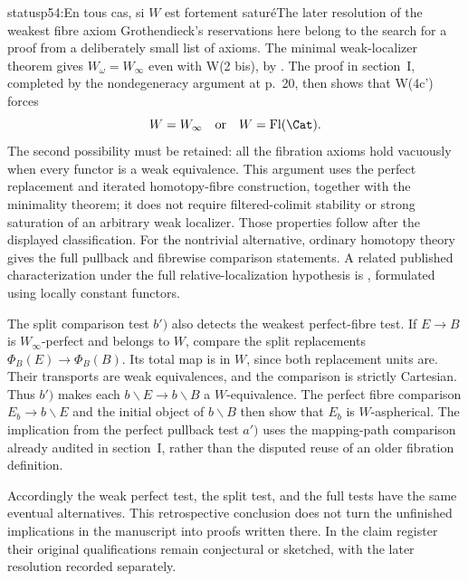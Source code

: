 \begin{dcomment}{status}{p54:En tous cas, si $W$ est fortement saturé}{The later resolution of the weakest fibre axiom}
Grothendieck's reservations here belong to the search for a proof from a deliberately small list of axioms. The minimal weak-localizer theorem gives $W_\omega=W_\infty$ even with W(2 bis), by \citet[Theorem~6.1.18]{Cisinski2006}. The proof in section~I, completed by the nondegeneracy argument at p.~20, then shows that W(4c') forces
\[
 W=W_\infty\quad\hbox{or}\quad W=\operatorname{Fl}(\Cat).
\]
The second possibility must be retained: all the fibration axioms hold vacuously when every functor is a weak equivalence. This argument uses the perfect replacement and iterated homotopy-fibre construction, together with the minimality theorem; it does not require filtered-colimit stability or strong saturation of an arbitrary weak localizer. Those properties follow after the displayed classification. For the nontrivial alternative, ordinary homotopy theory gives the full pullback and fibrewise comparison statements. A related published characterization under the full relative-localization hypothesis is \citet[Theorem~6.4.22 and Remark~6.4.23]{Cisinski2006}, formulated using locally constant functors.

The split comparison test $b')$ also detects the weakest perfect-fibre test. If $E\to B$ is $W_\infty$-perfect and belongs to $W$, compare the split replacements $\Phi_B(E)\to\Phi_B(B)$. Its total map is in $W$, since both replacement units are. Their transports are weak equivalences, and the comparison is strictly Cartesian. Thus $b')$ makes each $b\backslash E\to b\backslash B$ a $W$-equivalence. The perfect fibre comparison $E_b\to b\backslash E$ and the initial object of $b\backslash B$ then show that $E_b$ is $W$-aspherical. The implication from the perfect pullback test $a')$ uses the mapping-path comparison already audited in section~I, rather than the disputed reuse of an older fibration definition.

Accordingly the weak perfect test, the split test, and the full tests have the same eventual alternatives. This retrospective conclusion does not turn the unfinished implications in the manuscript into proofs written there. In the claim register their original qualifications remain conjectural or sketched, with the later resolution recorded separately.
\end{dcomment}

